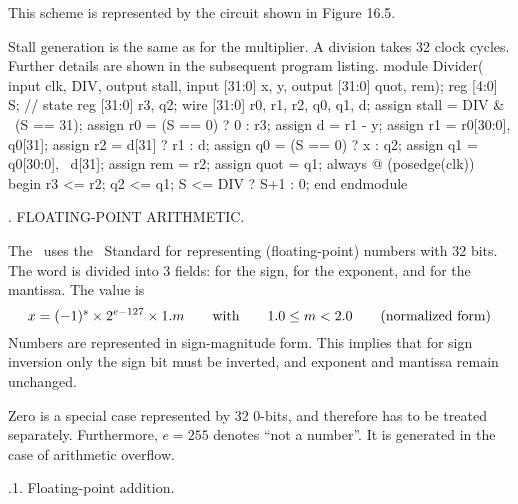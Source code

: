 {\medskip
{}\medskip

\noindent This scheme is represented by the circuit shown in Figure 16.5.


Stall generation is the same as for the multiplier. A division takes 32 clock cycles. Further details are shown in the subsequent program listing.
\begintt
module Divider(
input clk, DIV,
output stall,
input [31:0] x, y,
output [31:0] quot, rem);
reg [4:0] S; // state
reg [31:0] r3, q2;
wire [31:0] r0, r1, r2, q0, q1, d;
assign stall = DIV & ~(S == 31);
assign r0 = (S == 0) ? 0 : r3;
assign d = r1 - y;
assign r1 = {r0[30:0], q0[31]};
assign r2 = d[31] ? r1 : d;
assign q0 = (S == 0) ? x : q2;
assign q1 = {q0[30:0], ~d[31]};
assign rem = r2;
assign quot = q1;
always @ (posedge(clk)) begin
  r3 <= r2; q2 <= q1;
  S <= DIV ? S+1 : 0;
end
endmodule
\endtt

. FLOATING-POINT ARITHMETIC.

The \RISC\ uses the \IEEE\ Standard for representing  (floating-point) numbers with 32 bits. The word is divided into 3 fields:  for the sign,  for the exponent, and  for the mantissa. The value is
$$x = (-1)^s \times 2^{e-127} \times 1.m \qquad\hbox{with}\qquad 1.0 \le m < 2.0 \qquad\hbox{(normalized form)}$$
\noindent Numbers are represented in sign-magnitude form. This implies that for sign inversion only the sign bit must be inverted, and exponent and mantissa remain unchanged.

Zero is a special case represented by 32 0-bits, and therefore has to be treated separately. Furthermore, $e = 255$ denotes ``not a number''. It is generated in the case of arithmetic overflow.


.1. Floating-point addition.

}
